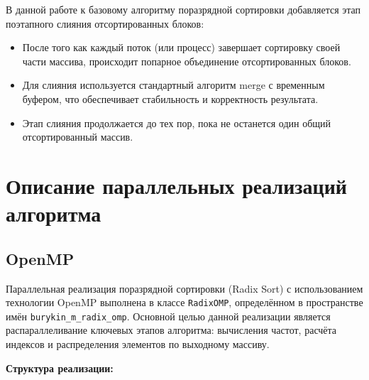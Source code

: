 \documentclass[12pt]{article}
\begin{document}
В данной работе к базовому алгоритму поразрядной сортировки добавляется этап поэтапного слияния отсортированных блоков:
\begin{itemize}
\item После того как каждый поток (или процесс) завершает сортировку своей части массива, происходит попарное объединение отсортированных блоков.
\item Для слияния используется стандартный алгоритм merge с временным буфером, что обеспечивает стабильность и корректность результата.
\item Этап слияния продолжается до тех пор, пока не останется один общий отсортированный массив.
\end{itemize}

\section{Описание параллельных реализаций алгоритма}

\subsection{OpenMP}

Параллельная реализация поразрядной сортировки (Radix Sort) с использованием технологии OpenMP выполнена в классе \texttt{RadixOMP}, определённом в пространстве имён \texttt{burykin\_m\_radix\_omp}. Основной целью данной реализации является распараллеливание ключевых этапов алгоритма: вычисления частот, расчёта индексов и распределения элементов по выходному массиву.

\textbf{Структура реализации:}
\end{document}
